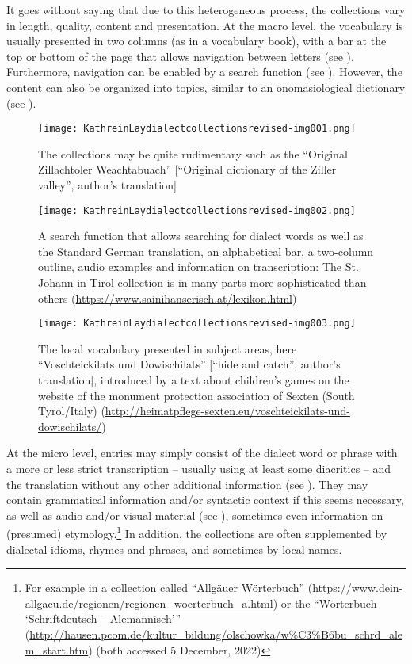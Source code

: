 \documentclass[output=paper]{langscibook}
\begin{document}
It goes without saying that due to this heterogeneous process, the collections vary in length, quality, content and presentation. At the macro level, the vocabulary is usually presented in two columns (as in a vocabulary book), with a bar at the top or bottom of the page that allows navigation between letters (see ). Furthermore, navigation can be enabled by a search function (see ). However, the content can also be organized into topics, similar to an onomasiological dictionary (see ).

  
\begin{figure}
\texttt{[image: KathreinLaydialectcollectionsrevised-img001.png]}
\caption{\label{fig:kathrein:1}The collections may be quite rudimentary such as the “Original Zillachtoler Weachtabuach” [“Original dictionary of the Ziller valley”, author’s translation] } 
\end{figure}

\begin{figure}
\texttt{[image: KathreinLaydialectcollectionsrevised-img002.png]}
\caption{\label{fig:kathrein:2} A search function that allows searching for dialect words as well as the Standard German translation, an alphabetical bar, a two-column outline, audio examples and information on transcription: The St. Johann in Tirol collection is in many parts more sophisticated than others (\url{https://www.sainihanserisch.at/lexikon.html})}
\end{figure}

\begin{figure}
\texttt{[image: KathreinLaydialectcollectionsrevised-img003.png]}
\caption{\label{fig:kathrein:3} The local vocabulary presented in subject areas, here “Voschteickilats und Dowischilats” [“hide and catch”, author’s translation], introduced by a text about children’s games on the website of the monument protection association of Sexten (South Tyrol/Italy) (\url{http://heimatpflege-sexten.eu/voschteickilats-und-dowischilats/})}
\end{figure}

At the micro level, entries may simply consist of the dialect word or phrase with a more or less strict transcription – usually using at least some diacritics – and the translation without any other additional information (see ). They may contain grammatical information and/or syntactic context if this seems necessary, as well as audio and/or visual material (see ), sometimes even information on (presumed) etymology.\footnote{For example in a collection called “Allgäuer Wörterbuch” (\url{https://www.dein-allgaeu.de/regionen/regionen_woerterbuch_a.html}) or the “Wörterbuch ‘Schriftdeutsch – Alemannisch’” (\url{http://hausen.pcom.de/kultur_bildung/olschowka/w\%C3\%B6bu_schrd_alem_start.htm}) (both accessed 5 December, 2022)} In addition, the collections are often supplemented by dialectal idioms, rhymes and phrases, and sometimes by local names.
\end{document}
